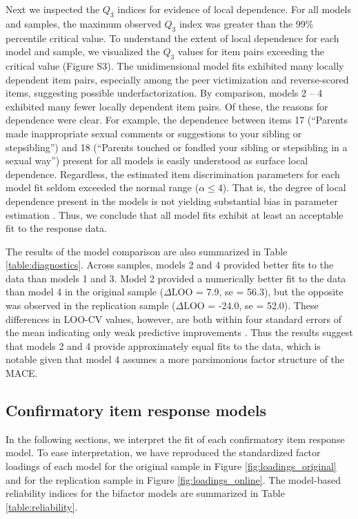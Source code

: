 \documentclass[letterpaper,man,natbib,floatsintext,longtable]{apa6}
\begin{document}
Next we inspected the $Q_3$ indices for evidence of local dependence. For all models and samples, the maximum observed $Q_3$ index was greater than the 99\% percentile critical value. To understand the extent of local dependence for each model and sample, we visualized the $Q_3$ values for item pairs exceeding the critical value (Figure S3). The unidimensional model fits exhibited many locally dependent item pairs, especially among the peer victimization and reverse-scored items, suggesting possible underfactorization. By comparison, models 2 -- 4 exhibited many fewer locally dependent item pairs. Of these, the reasons for dependence were clear. For example, the dependence between items 17 (``Parents made inappropriate sexual comments or suggestions to your sibling or stepsibling'') and 18 (``Parents touched or fondled your sibling or stepsibling in a sexual way'') present for all models is easily understood as surface local dependence. Regardless, the estimated item discrimination parameters for each model fit seldom exceeded the normal range ($\alpha \leq 4$). That is, the degree of local dependence present in the models is not yielding substantial bias in parameter estimation \citep{edwards2018diagnostic}. Thus, we conclude that all model fits exhibit at least an acceptable fit to the response data.

The results of the model comparison are also summarized in Table \ref{table:diagnostics}. Across samples, models 2 and 4 provided better fits to the data than models 1 and 3. Model 2 provided a numerically better fit to the data than model 4 in the original sample ($\Delta \text{LOO}$ = 7.9, se = 56.3), but the opposite was observed in the replication sample ($\Delta \text{LOO}$ = -24.0, se = 52.0). These differences in LOO-CV values, however, are both within four standard errors of the mean indicating only weak predictive improvements \citep{vehtari2022cv}. Thus the results suggest that models 2 and 4 provide approximately equal fits to the data, which is notable given that model 4 assumes a more parsimonious factor structure of the MACE.

\subsection{Confirmatory item response models}

In the following sections, we interpret the fit of each confirmatory item response model. To ease interpretation, we have reproduced the standardized factor loadings of each model for the original sample in Figure \ref{fig:loadings_original} and for the replication sample in Figure \ref{fig:loadings_online}. The model-based reliability indices for the bifactor models are summarized in Table \ref{table:reliability}. 
\end{document}
